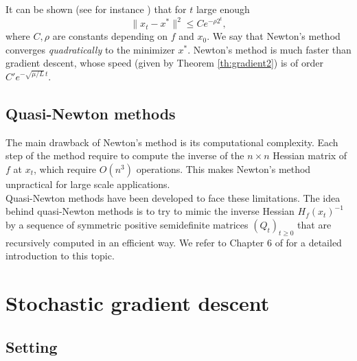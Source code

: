 \documentclass[11pt,nocut]{article}
\begin{document}
It can be shown (see for instance \cite{boyd2004convex}) that for $t$ large enough
\begin{equation}\label{eq:newton}
\|x_t - x^* \|^2 \leq C e^{-\rho 2^t},
\end{equation}
where $C,\rho$ are constants depending on $f$ and $x_0$. We say that Newton's method converges \emph{quadratically} to the minimizer $x^*$. Newton's method is much faster than gradient descent, whose speed (given by Theorem \ref{th:gradient2}) is of order $C' e^{-\sqrt{\mu/L} \, t}$.


\subsection{Quasi-Newton methods}

The main drawback of Newton's method is its computational complexity. Each step of the method require to compute the inverse of the $n \times n$ Hessian matrix of $f$ at $x_t$, which require $O(n^3)$ operations. This makes Newton's method unpractical for large scale applications.
\\

Quasi-Newton methods have been developed to face these limitations. 
The idea behind quasi-Newton methods is to try to mimic the inverse Hessian $H_f(x_t)^{-1}$ by a sequence of symmetric positive semidefinite matrices $(Q_t)_{t \geq 0}$ that are recursively computed in an efficient way. We refer to Chapter 6 of \cite{nocedal2006numerical} for a detailed introduction to this topic.

\section{Stochastic gradient descent}

\subsection{Setting}
\end{document}
